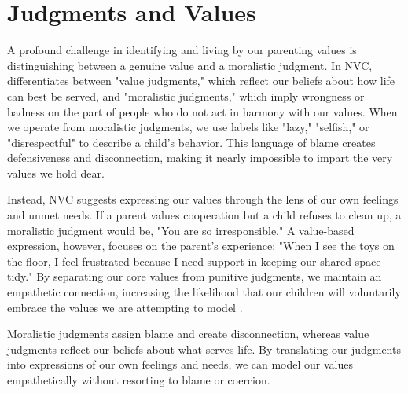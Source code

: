 \section{Judgments and Values}

A profound challenge in identifying and living by our parenting values is distinguishing between a genuine value and a moralistic judgment.
In NVC, \citet{rosenberg2003} differentiates between "value judgments," which reflect our beliefs about how life can best be served, and "moralistic judgments," which imply wrongness or badness on the part of people who do not act in harmony with our values.
When we operate from moralistic judgments, we use labels like "lazy," "selfish," or "disrespectful" to describe a child's behavior.
This language of blame creates defensiveness and disconnection, making it nearly impossible to impart the very values we hold dear.

Instead, NVC suggests expressing our values through the lens of our own feelings and unmet needs.
If a parent values cooperation but a child refuses to clean up, a moralistic judgment would be, "You are so irresponsible."
A value-based expression, however, focuses on the parent's experience: "When I see the toys on the floor, I feel frustrated because I need support in keeping our shared space tidy."
By separating our core values from punitive judgments, we maintain an empathetic connection, increasing the likelihood that our children will voluntarily embrace the values we are attempting to model \citep{kohn2005}.

\begin{keyinsight}
Moralistic judgments assign blame and create disconnection, whereas value judgments reflect our beliefs about what serves life.
By translating our judgments into expressions of our own feelings and needs, we can model our values empathetically without resorting to blame or coercion.
\end{keyinsight}

\newpage
